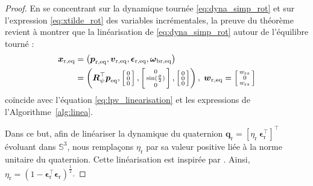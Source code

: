 \begin{proof}
En se concentrant sur la dynamique tournée \eqref{eq:dyna_simp_rot} et sur l'expression \eqref{eq:xtilde_rot} des variables incrémentales, la preuve du théorème revient à montrer que la linéarisation de \eqref{eq:dyna_simp_rot} autour de l'équilibre tourné : 
\begin{align}
\label{eq:rotated_eq}
\boldsymbol{x}_{\text{r,eq}} &= \left( \boldsymbol{p}_{\text{r,eq}}, \boldsymbol{v}_{\text{r,eq}},
\boldsymbol{\epsilon}_{\text{r,eq}},
\boldsymbol{\omega}_{\text{br,eq}} \right) \\
\nonumber
&= \left(\boldsymbol{R}^\top_{\psi} \boldsymbol{p}_{\text{eq}},  
\left[ \begin{smallmatrix}0 \\ 0 \\ 0 \end{smallmatrix} \right],   \left[ \begin{smallmatrix}0 \\ \sin(\frac{\theta}{2}) \\ 0 \end{smallmatrix} \right], 
\left[ \begin{smallmatrix}0 \\ 0 \\ 0 \end{smallmatrix} \right] \right),\;
\boldsymbol{w}_{\mathrm{r,eq}}  = \left[ \begin{smallmatrix}w_{\text{r}x} \\ 0 \\w_{\text{r}z} \end{smallmatrix} \right]
\end{align}
coïncide avec l'équation \eqref{eq:lpv_linearisation} et les expressions de l'Algorithme~\ref{alg:linea}.

Dans ce but, afin de linéariser la dynamique du quaternion $\boldsymbol{q}_{\text{r}} = \left[ \eta_{\text{r}} ~ \boldsymbol{\epsilon}_{\text{r}}^\top \right]^\top$ évoluant dans ${\mathbb S}^3$, nous remplaçons  $\eta_{\text{r}}$ par sa valeur positive liée à la norme unitaire du quaternion. Cette linéarisation est  inspirée par \cite[Proof of Lemma 1]{tregouetHal-01760720}. Ainsi, $\eta_{\text{r}} = (1- \boldsymbol{\epsilon}_{\text{r}}^\top \boldsymbol{\epsilon}_{\text{r}})^\frac{1}{2}$.


\end{proof}
